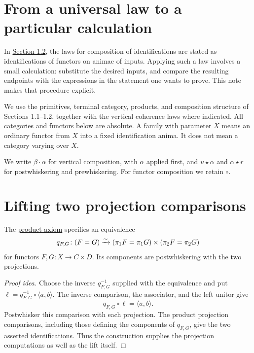 \documentclass[11pt]{article}
\begin{document}
\section*{From a universal law to a particular calculation}

In \href{coherences.html\#post:Composition_Of_Identifications}{Section 1.2},
the laws for composition of identifications are stated as identifications of
functors on animae of inputs. Applying such a law involves a small calculation:
substitute the desired inputs, and compare the resulting endpoints with the
expressions in the statement one wants to prove. This note makes that procedure
explicit.

We use the primitives, terminal category, products, and composition structure
of Sections 1.1--1.2, together with the vertical coherence laws where indicated.
All categories and functors below are absolute. A family with parameter $X$
means an ordinary functor from $X$ into a fixed identification anima.
It does not mean a category varying over $X$.

We write $\beta\cdot\alpha$ for vertical composition, with $\alpha$ applied
first, and $u\star\alpha$ and $\alpha\star r$ for postwhiskering and
prewhiskering. For functor composition we retain $\circ$.

\section*{Lifting two projection comparisons}

The \href{basic-vocabulary.html\#post:Product_Of_Categories}{product axiom}
specifies an equivalence
\[
 q_{F,G}\colon(F=G)\xrightarrow{\sim}
   (\pi_1F=\pi_1G)\times(\pi_2F=\pi_2G)
\]
for functors $F,G\colon X\to C\times D$. Its components are postwhiskering
with the two projections.

\begin{proof}[Proof idea]
Choose the inverse $q_{F,G}^{-1}$ supplied with the equivalence and put
$\ell=q_{F,G}^{-1}\circ\langle a,b\rangle$.
The inverse comparison, the associator, and the left unitor give
\[
 q_{F,G}\circ\ell=\langle a,b\rangle.
\]
Postwhisker this comparison with each projection. The product projection
comparisons, including those defining the components of $q_{F,G}$, give the
two asserted identifications. Thus the construction supplies the projection
computations as well as the lift itself.
\end{proof}
\end{document}
